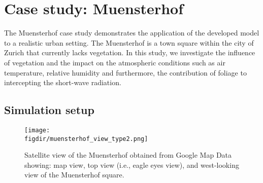 



 


\section{Case study: Muensterhof}

The Muensterhof case study demonstrates the application of the developed model to a realistic urban setting. The Muensterhof is a town square within the city of Zurich that currently lacks vegetation. In this study, we investigate the influence of vegetation and the impact on the atmospheric conditions such as air temperature, relative humidity and furthermore, the contribution of foliage to intercepting the short-wave radiation. 

\subsection{Simulation setup}
\label{sec:muenstersetup}

\begin{figure}[t]
	\centering
	\texttt{[image: \\figdir/muensterhof\_view\_type2.png]}
	\caption{Satellite view of the Muensterhof obtained from Google Map Data showing:  map view,  top view (i.e., eagle eyes view), and  west-looking view of the Muensterhof square.}
	\label{fig:muensterhof_view}
\end{figure}

